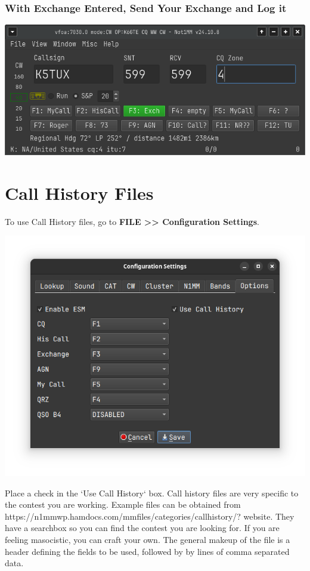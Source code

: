 \documentclass{article}
\begin{document}
\subsubsection{With Exchange Entered, Send Your Exchange and Log it}

\vspace{0.5cm}
\includegraphics[width=0.75\linewidth]{pic/esm_sp_logit.png}
\newpage
\section{Call History Files}

To use Call History files, go to \textbf{FILE >> Configuration Settings}.

\vspace{0.5cm}
\includegraphics[width=0.9\linewidth]{pic/configuration_options.png}
\vspace{0.5cm}

Place a check in the `Use Call History` box. Call history files are very specific to the contest you are working. Example files can be obtained from https://n1mmwp.hamdocs.com/mmfiles/categories/callhistory/? website. They have a searchbox so you can find the contest you are looking for. If you are feeling masocistic, you can craft your own. The general makeup of the file is a header defining the fields to be used, followed by by lines of comma separated data.
\newpage
\end{document}
